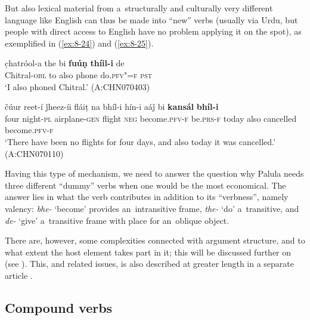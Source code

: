But also lexical material from a~structurally and culturally very different language like English can thus be made into ``new'' verbs (usually via Urdu, but people with direct access to English have no problem applying it on the spot), as exemplified in (\ref{ex:8-24}) and (\ref{ex:8-25}).

\begin{exe}
\ex
\label{ex:8-24}
\gll c̣hatróol-a the bi \textbf{fuúṇ} \textbf{thíil-i} de\\
Chitral-\textsc{obl} to also phone do.\textsc{pfv"=f} \textsc{pst}\\
\glt `I also phoned Chitral.' (A:CHN070403)
\end{exe}
\begin{exe}
\ex
\label{ex:8-25}
\gll čúur reet-í ǰheez-íi fláiṭ na bhíl-i  hín-i aáǰ bi \textbf{kansál} \textbf{bhíl-i}\\
four night-\textsc{pl} airplane-\textsc{gen} flight \textsc{neg} become.\textsc{pfv-f}  be.\textsc{prs-f} today also cancelled become.\textsc{pfv-f}\\
\glt `There have been no flights for four days, and also today it was cancelled.' (A:CHN070110)
\end{exe}

Having this type of mechanism, we need to answer the question why Palula needs three different ``dummy'' verbs when one would be the most economical. The answer lies in what the verb contributes in addition to its ``verbness'', namely valency: \textit{bhe-} `become' provides an~intransitive frame, \textit{the-} `do' a~transitive, and \textit{de-} `give' a~transitive frame with place for an~oblique object. 


There are, however, some complexities connected with argument structure, and to what extent the host element takes part in it; this will be discussed further on (see ). This, and related issues, is also described at greater length in a separate article \citep{liljegren2010}.


\subsection{Compound verbs}
\label{subsec:8-6-2}

